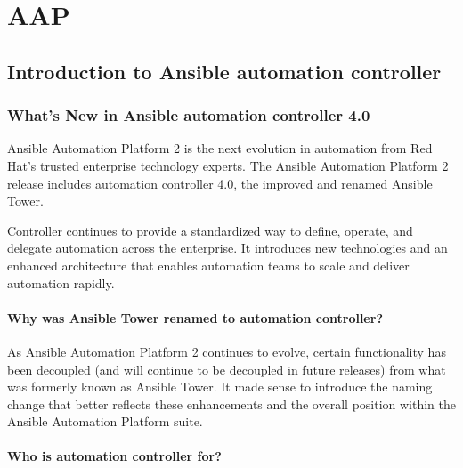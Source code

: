 \chapter{AAP}

\hypertarget{introduction-to-ansible-automation-controller}{%
\section{Introduction to Ansible automation
controller}\label{introduction-to-ansible-automation-controller}}

\hypertarget{whats-new-in-ansible-automation-controller-4.0}{%
\subsection{What's New in Ansible automation controller
4.0}\label{whats-new-in-ansible-automation-controller-4.0}}

Ansible Automation Platform 2 is the next evolution in automation from
Red Hat's trusted enterprise technology experts. The Ansible Automation
Platform 2 release includes automation controller 4.0, the improved and
renamed Ansible Tower.

Controller continues to provide a standardized way to define, operate,
and delegate automation across the enterprise. It introduces new
technologies and an enhanced architecture that enables automation teams
to scale and deliver automation rapidly.

\hypertarget{why-was-ansible-tower-renamed-to-automation-controller}{%
\subsubsection{Why was Ansible Tower renamed to automation
controller?}\label{why-was-ansible-tower-renamed-to-automation-controller}}

As Ansible Automation Platform 2 continues to evolve, certain
functionality has been decoupled (and will continue to be decoupled in
future releases) from what was formerly known as Ansible Tower. It made
sense to introduce the naming change that better reflects these
enhancements and the overall position within the Ansible Automation
Platform suite.

\hypertarget{who-is-automation-controller-for}{%
\subsubsection{Who is automation controller
for?}\label{who-is-automation-controller-for}}

